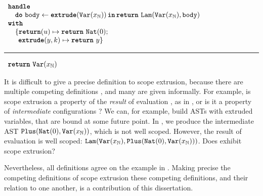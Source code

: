 \begin{code}
  \begin{efflst}
    $\begin{array}{l}
      \textbf{\texttt{handle}} \\
      \quad \texttt{\textbf{do}} \,\, {\texttt{body}} \leftarrow {\textbf{\texttt{extrude}}({\texttt{Var}(x_{\mathbb{N}})})} \, \textbf{\texttt{in}} \, {\texttt{\textbf{return}} \,\, {\texttt{Lam}(\texttt{Var}(x_{\mathbb{N}}), \texttt{body})}} \\
      \textbf{\texttt{with}} \\
      \quad \{ \textbf{\texttt{return}}(u) \mapsto {\texttt{\textbf{return}} \,\, {\texttt{Nat}(0)}}; \\
      \quad \; \, \textbf{\texttt{extrude}}(y, k) \mapsto {\texttt{\textbf{return}} \,\, {y}}\}\\
    \end{array}$

    \vspace{2mm} 
\textcolor{effComment}{\hrule height 0.2mm \relax}
\vspace{2mm} 

\textcolor{effComment}{$\begin{array}{l}\texttt{\textbf{return}} \,\, {\texttt{Var}(x_{\mathbb{N}})}\end{array}$}

  \end{efflst}
  \label{listing:efflang-scope-extrusion}
  \end{code}

It is difficult to give a precise definition to scope extrusion, because there are multiple competing definitions \citep{kiselyov-14,kiselyov-16}, and many are given informally. For example, is scope extrusion a property of the \textit{result} of evaluation \citep{kiselyov-16}, as in , or is it a property of \textit{intermediate} configurations \citep{kiselyov-14}? We can, for example, build ASTs with extruded variables, that are bound at some future point. In , we produce the intermediate AST $\texttt{Plus}(\texttt{Nat}({0}), \texttt{Var}(x_{\mathbb{N}}))$, which is not well scoped. However, the result of evaluation is well scoped: $\texttt{Lam}(\texttt{Var}(x_{\mathbb{N}}), \texttt{Plus}(\texttt{Nat}({0}), \texttt{Var}(x_{\mathbb{N}})))$. Does  exhibit scope extrusion?

Nevertheless, all definitions agree on the example in . Making precise the competing definitions of scope extrusion these competing definitions, and their relation to one another, is a contribution of this dissertation. 
% 

